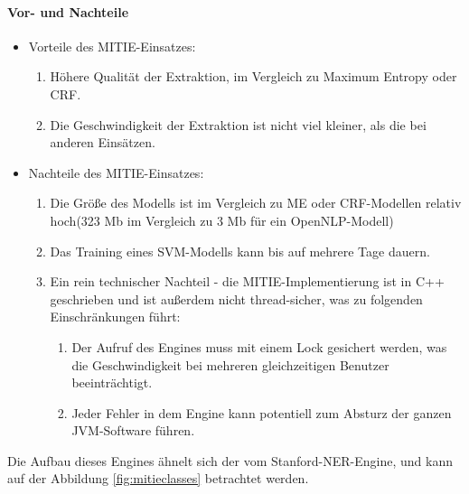 \paragraph{Vor- und Nachteile}
\begin{itemize}
\item Vorteile des MITIE-Einsatzes:
\begin{enumerate}
\item Höhere Qualität der Extraktion, im Vergleich zu Maximum Entropy oder CRF.
\item Die Geschwindigkeit der Extraktion ist nicht viel kleiner, als die bei anderen Einsätzen.
\end{enumerate}
\item Nachteile des MITIE-Einsatzes:
\begin{enumerate}
\item Die Größe des Modells ist im Vergleich zu ME oder CRF-Modellen relativ hoch(323 Mb im Vergleich zu 3 Mb für ein OpenNLP-Modell)
\item Das Training eines SVM-Modells kann bis auf mehrere Tage dauern.
\item Ein rein technischer Nachteil - die MITIE-Implementierung ist in C++ geschrieben und ist außerdem nicht thread-sicher, was zu folgenden Einschränkungen führt:
\begin{enumerate}
\item Der Aufruf des Engines muss mit einem Lock gesichert werden, was die Geschwindigkeit bei mehreren gleichzeitigen Benutzer beeinträchtigt.
\item Jeder Fehler in dem Engine kann potentiell zum Absturz der ganzen JVM-Software führen.
\end{enumerate}
\end{enumerate}
\end{itemize}

Die Aufbau dieses Engines ähnelt sich der vom Stanford-NER-Engine, und kann auf der Abbildung \ref{fig:mitieclasses} betrachtet werden.

